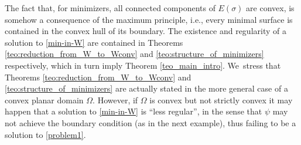 \documentclass[11pt]{article}
\newcommand{\ie}{i.e.,\xspace}
\numberwithin{equation}{section}
\theoremstyle{definition}
\begin{document}
The fact that, for minimizers, all connected components of $E(\sigma)$ are convex, is somehow a consequence of the maximum principle, \ie every minimal surface is contained in the convex hull of its boundary.
The existence and regularity of a solution to \eqref{min-in-W} are contained in Theorems \ref{teo:reduction_from_W_to_Wconv} and \ref{teo:structure_of_minimizers}
respectively, which in turn imply Theorem \ref{teo_main_intro}. We~stress that Theorems \ref{teo:reduction_from_W_to_Wconv} and \ref{teo:structure_of_minimizers} are actually stated in the more general case of
a convex planar domain $\Omega$. However, if $\Omega$ is convex but not strictly convex it may happen that a solution to \eqref{min-in-W} is ``less regular'', in the sense that $\psi$ may not achieve the boundary condition (as in the next example),
thus failing to be a solution to \eqref{problem1}.
\end{document}
